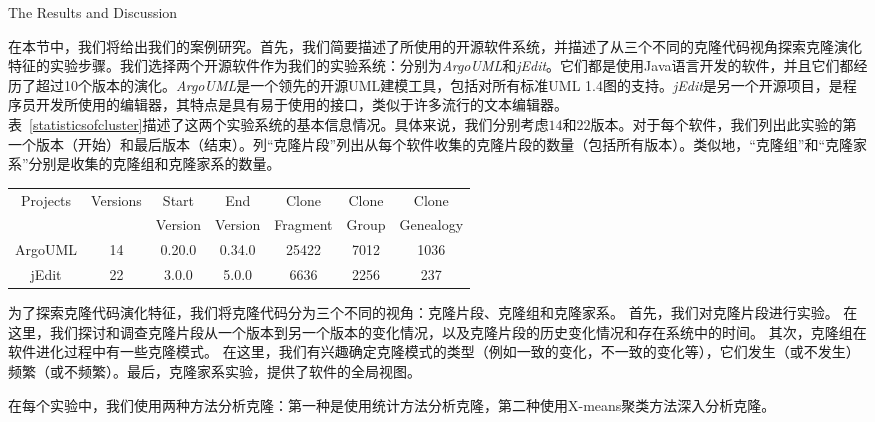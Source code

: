 {The Results and Discussion}

在本节中，我们将给出我们的案例研究。首先，我们简要描述了所使用的开源软件系统，并描述了从三个不同的克隆代码视角探索克隆演化特征的实验步骤。我们选择两个开源软件作为我们的实验系统：分别为{\em ArgoUML}和{\em jEdit}。它们都是使用Java语言开发的软件，并且它们都经历了超过10个版本的演化。{\em ArgoUML}是一个领先的开源UML建模工具，包括对所有标准UML 1.4图的支持。{\em jEdit}是另一个开源项目，是程序员开发所使用的编辑器，其特点是具有易于使用的接口，类似于许多流行的文本编辑器。\\

表~\ref{statisticsofcluster}描述了这两个实验系统的基本信息情况。具体来说，我们分别考虑$ 14 $和$ 22 $版本。对于每个软件，我们列出此实验的第一个版本（开始）和最后版本（结束）。列“克隆片段”列出从每个软件收集的克隆片段的数量（包括所有版本）。类似地，“克隆组”和“克隆家系”分别是收集的克隆组和克隆家系的数量。
\begin{table}[htbp]
\vspace{0.5em}\centering \wuhao
\begin{tabular}{ccccccc}
\toprule [1.5pt ]
\multirow{2}{*}{Projects}&\multirow{2}{*}{Versions}&Start&End&Clone&Clone&Clone\\ 
&&Version&Version&Fragment&Group&Genealogy\\
\midrule[1pt]
ArgoUML&14&0.20.0&0.34.0&25422&7012&1036\\ 
jEdit&22&3.0.0&5.0.0&6636&2256	&237\\ 
\bottomrule [1.5pt]
\end{tabular}
\end{table}

为了探索克隆代码演化特征，我们将克隆代码分为三个不同的视角：克隆片段、克隆组和克隆家系。 首先，我们对克隆片段进行实验。 在这里，我们探讨和调查克隆片段从一个版本到另一个版本的变化情况，以及克隆片段的历史变化情况和存在系统中的时间。 其次，克隆组在软件进化过程中有一些克隆模式。 在这里，我们有兴趣确定克隆模式的类型（例如一致的变化，不一致的变化等），它们发生（或不发生）频繁（或不频繁）。最后，克隆家系实验，提供了软件的全局视图。

在每个实验中，我们使用两种方法分析克隆：第一种是使用统计方法分析克隆，第二种使用X-means聚类方法深入分析克隆。


